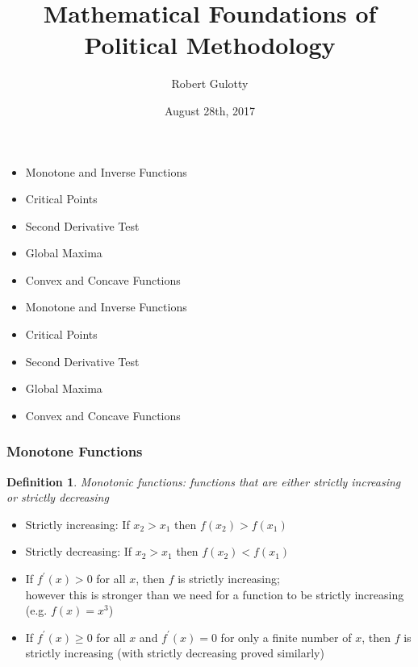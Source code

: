 \documentclass{beamer}
\title[PLSC 43401] %
{Mathematical Foundations of Political Methodology}
\author{Robert Gulotty}
\institute[University of Chicago]{Associate Professor\\Department of Political Science \\  University of Chicago}
\date{August 28th, 2017}
\newtheorem{defn}{Definition}
\numberwithin{equation}{section}
\begin{document}
\begin{frame}
\titlepage
\end{frame}



\begin{frame}

\begin{itemize}
\item \textcolor{myblack}{Monotone and Inverse Functions}
\item \textcolor{myblack}{Critical Points}
\item \textcolor{myblack}{Second Derivative Test}
\item \textcolor{myblack}{Global Maxima}
\item \textcolor{myblack}{Convex and Concave Functions}
\end{itemize}

\end{frame}



\begin{frame}

\begin{itemize}
\item \textcolor{myblack}{Monotone and Inverse Functions}
\item \textcolor{mygray}{Critical Points}
\item \textcolor{mygray}{Second Derivative Test}
\item \textcolor{mygray}{Global Maxima}
\item \textcolor{mygray}{Convex and Concave Functions}
\end{itemize}

\end{frame}



\begin{frame}
\frametitle{Monotone Functions}

\begin{defn}
Monotonic functions: functions that are either \textit{strictly increasing} or \textit{strictly decreasing}
\end{defn} \pause

\begin{itemize}
\item Strictly increasing: If $x_2>x_1$ then $f(x_2)>f(x_1)$
\item Strictly decreasing: If $x_2>x_1$ then $f(x_2)<f(x_1)$ \pause
\item If $f^\prime(x)>0$ for all $x$, then $f$ is strictly increasing; \\however this is stronger than we need for a function to be strictly increasing (e.g. $f(x)=x^3$)
\item If $f^\prime(x)\geq 0$ for all $x$ and $f^\prime(x)=0$ for only a finite number of $x$, then $f$ is strictly increasing (with strictly decreasing proved similarly)
\end{itemize}

\end{frame}
\end{document}
